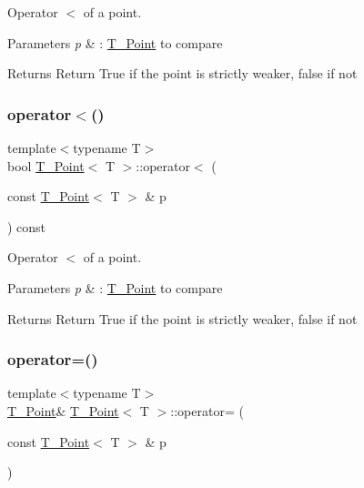 Operator $<$ of a point. 


\begin{DoxyParams}{Parameters}
{\em p} & \+: \hyperlink{classT__Point}{T\+\_\+\+Point} to compare \\
\hline
\end{DoxyParams}
\begin{DoxyReturn}{Returns}
Return True if the point is strictly weaker, false if not 
\end{DoxyReturn}
\mbox{\label{classT__Point_a95cb559fe5888b44481f6ad3aebabefe}} 
\subsubsection{\texorpdfstring{operator$<$()}{operator<()}\hspace{0.1cm}{\footnotesize\ttfamily [2/2]}}
{\footnotesize\ttfamily template$<$typename T$>$ \\
bool \hyperlink{classT__Point}{T\+\_\+\+Point}$<$ T $>$\+::operator$<$ (\begin{DoxyParamCaption}\item[{const \hyperlink{classT__Point}{T\+\_\+\+Point}$<$ T $>$ \&}]{p }\end{DoxyParamCaption}) const\hspace{0.3cm}{\ttfamily [inline]}}



Operator $<$ of a point. 


\begin{DoxyParams}{Parameters}
{\em p} & \+: \hyperlink{classT__Point}{T\+\_\+\+Point} to compare \\
\hline
\end{DoxyParams}
\begin{DoxyReturn}{Returns}
Return True if the point is strictly weaker, false if not 
\end{DoxyReturn}
\mbox{\label{classT__Point_a13fbb5646f2333aa41194d648423e10f}} 
\subsubsection{\texorpdfstring{operator=()}{operator=()}\hspace{0.1cm}{\footnotesize\ttfamily [1/2]}}
{\footnotesize\ttfamily template$<$typename T$>$ \\
\hyperlink{classT__Point}{T\+\_\+\+Point}\& \hyperlink{classT__Point}{T\+\_\+\+Point}$<$ T $>$\+::operator= (\begin{DoxyParamCaption}\item[{const \hyperlink{classT__Point}{T\+\_\+\+Point}$<$ T $>$ \&}]{p }\end{DoxyParamCaption})\hspace{0.3cm}{\ttfamily [inline]}}



